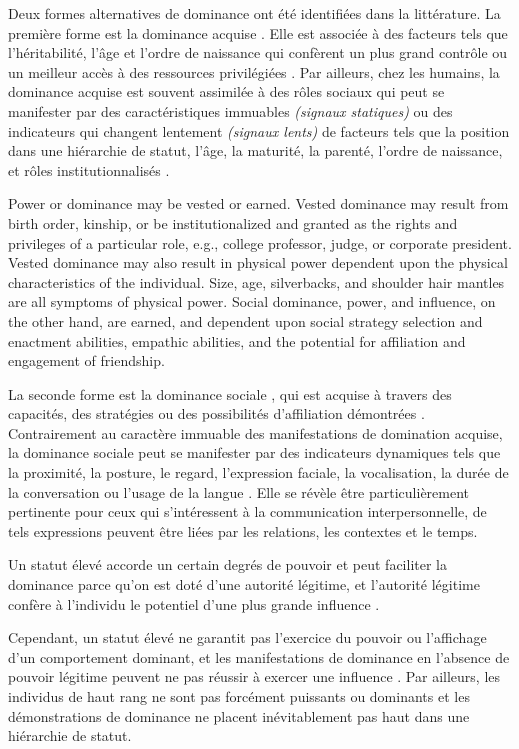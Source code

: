 	Deux formes alternatives de dominance ont été identifiées dans la littérature.
	La première forme est la dominance acquise \cite{liska1990dominance}. Elle est associée à des facteurs tels que l'héritabilité, l'âge et l'ordre de naissance qui confèrent un plus grand contrôle ou un meilleur accès à des ressources privilégiées \cite{cattell1970handbook}.
	Par ailleurs, chez les humains, la dominance acquise est souvent assimilée à des rôles sociaux qui peut se manifester par des caractéristiques immuables \textit{(signaux statiques)} ou des indicateurs qui changent lentement \textit{(signaux lents)} de facteurs tels que la position dans une hiérarchie de statut, l'âge, la maturité, la parenté, l'ordre de naissance, et rôles institutionnalisés \cite{burgoonnonverbal}. 
	
	Power or dominance may be vested
	or earned. Vested dominance may result from birth order, kinship, or be institutionalized
	and granted as the rights and privileges of a particular role, e.g., college professor, judge,
	or corporate president. Vested dominance may also result in physical power dependent
	upon the physical characteristics of the individual. Size, age, silverbacks, and shoulder
	hair mantles are all symptoms of physical power. Social dominance, power, and influence,
	on the other hand, are earned, and dependent upon social strategy selection and enactment
	abilities, empathic abilities, and the potential for affiliation and engagement of
	friendship. 
	
	La seconde forme est la dominance sociale \cite{liska1990dominance}, qui est acquise à travers des capacités, des stratégies ou des possibilités d'affiliation démontrées \cite{burgoon1998nature}. Contrairement au caractère immuable des manifestations de domination acquise, la dominance sociale peut se manifester par des indicateurs dynamiques tels que la proximité, la posture, le regard, l'expression faciale, la vocalisation, la durée de la conversation ou l'usage de la langue \cite{keating1985human}. Elle se révèle être particulièrement pertinente pour ceux qui s'intéressent à la communication interpersonnelle, de tels expressions peuvent être liées par les relations, les contextes et le temps\cite{burgoon1998nature}.
		
	Un statut élevé accorde un certain degrés de pouvoir et peut faciliter la dominance parce qu'on est doté d'une autorité légitime, et l'autorité légitime confère à l'individu le potentiel d'une plus grande influence \cite{burgoon2006nonverbal}. 
	
	Cependant, un statut élevé ne garantit pas l'exercice du pouvoir ou l'affichage d'un comportement dominant, et les manifestations de dominance en l'absence de pouvoir légitime peuvent ne pas réussir à exercer une influence \cite{ridgeway1995legitimacy}.
	Par ailleurs, les individus de haut rang ne sont pas forcément puissants ou dominants et les démonstrations de dominance ne placent inévitablement pas haut dans une hiérarchie de statut\cite{burgoonnonverbal}.
	
